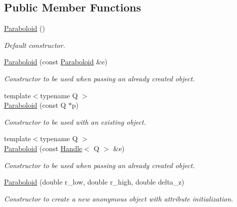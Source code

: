 \subsection*{Public Member Functions}
\begin{DoxyCompactItemize}
\item 
\hyperlink{class_d_d4hep_1_1_geometry_1_1_paraboloid_a8be57432e8083414ec8e3fbe1ba5fcbf}{Paraboloid} ()
\begin{DoxyCompactList}\small\item\em Default constructor. \item\end{DoxyCompactList}\item 
\hyperlink{class_d_d4hep_1_1_geometry_1_1_paraboloid_a76b6c7202094152e36fdcd088c818898}{Paraboloid} (const \hyperlink{class_d_d4hep_1_1_geometry_1_1_paraboloid}{Paraboloid} \&e)
\begin{DoxyCompactList}\small\item\em Constructor to be used when passing an already created object. \item\end{DoxyCompactList}\item 
{\footnotesize template$<$typename Q $>$ }\\\hyperlink{class_d_d4hep_1_1_geometry_1_1_paraboloid_af0eee2cf28b2701fa2e3829a8b60cadc}{Paraboloid} (const Q $\ast$p)
\begin{DoxyCompactList}\small\item\em Constructor to be used with an existing object. \item\end{DoxyCompactList}\item 
{\footnotesize template$<$typename Q $>$ }\\\hyperlink{class_d_d4hep_1_1_geometry_1_1_paraboloid_ad20a769f56a02cef5d62a7795396cddc}{Paraboloid} (const \hyperlink{class_d_d4hep_1_1_handle}{Handle}$<$ Q $>$ \&e)
\begin{DoxyCompactList}\small\item\em Constructor to be used when passing an already created object. \item\end{DoxyCompactList}\item 
\hyperlink{class_d_d4hep_1_1_geometry_1_1_paraboloid_a5819ff6e96e1969a6e342d53e4bdc09c}{Paraboloid} (double r\_\-low, double r\_\-high, double delta\_\-z)
\begin{DoxyCompactList}\small\item\em Constructor to create a new anonymous object with attribute initialization. \item\end{DoxyCompactList}\item 

\end{DoxyCompactItemize}
